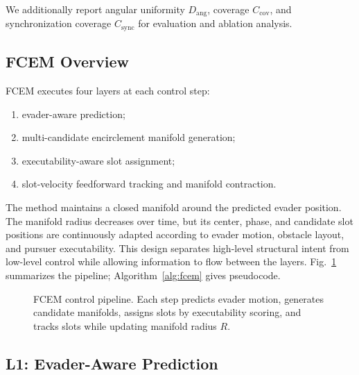 \documentclass[journal]{IEEEtran}
\newcommand{\Dang}{D_{\mathrm{ang}}}
\newcommand{\Ccov}{C_{\mathrm{cov}}}
\newcommand{\Csync}{C_{\mathrm{sync}}}
\begin{document}
We additionally report angular uniformity $\Dang$, coverage $\Ccov$, and synchronization coverage $\Csync$ for evaluation and ablation analysis.

\subsection{FCEM Overview}
\label{sec:fcem_overview}

FCEM executes four layers at each control step:
\begin{enumerate}
  \item evader-aware prediction;
  \item multi-candidate encirclement manifold generation;
  \item executability-aware slot assignment;
  \item slot-velocity feedforward tracking and manifold contraction.
\end{enumerate}
The method maintains a closed manifold around the predicted evader position.
The manifold radius decreases over time, but its center, phase, and candidate slot positions are continuously adapted according to evader motion, obstacle layout, and pursuer executability.
This design separates high-level structural intent from low-level control while allowing information to flow between the layers.
Fig.~\ref{fig:pipeline} summarizes the pipeline; Algorithm~\ref{alg:fcem} gives pseudocode.

\begin{figure}[!t]
  \centering
  \caption{FCEM control pipeline. Each step predicts evader motion, generates candidate manifolds, assigns slots by executability scoring, and tracks slots while updating manifold radius $R$.}
  \label{fig:pipeline}
\end{figure}

\subsection{L1: Evader-Aware Prediction}
\label{sec:l1}
\end{document}
